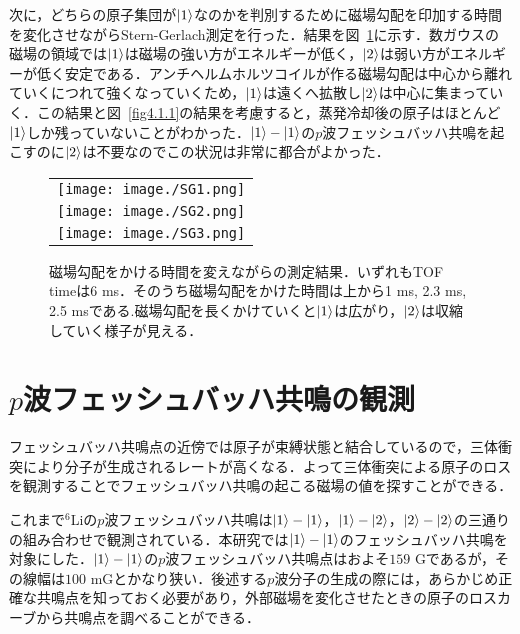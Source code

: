 \documentclass[11pt,a4j,notitlepage]{jreport}
\newcommand{\fig}[1]{図~\ref{#1}}	%
\begin{document}
次に，どちらの原子集団が$\ket{1}$なのかを判別するために磁場勾配を印加する時間を変化させながらStern-Gerlach測定を行った．結果を\fig{fig4.1.2}に示す．数ガウスの磁場の領域では$\ket{1}$は磁場の強い方がエネルギーが低く，$\ket{2}$は弱い方がエネルギーが低く安定である．アンチヘルムホルツコイルが作る磁場勾配は中心から離れていくにつれて強くなっていくため，$\ket{1}$は遠くへ拡散し$\ket{2}$は中心に集まっていく．この結果と\fig{fig4.1.1}の結果を考慮すると，蒸発冷却後の原子はほとんど$\ket{1}$しか残っていないことがわかった．$\ket{1}-\ket{1}$の$p$波フェッシュバッハ共鳴を起こすのに$\ket{2}$は不要なのでこの状況は非常に都合がよかった．
\begin{figure}[H]
	\begin{tabular}{c}
		\begin{minipage}[t]{1\hsize}
			\centering
				\texttt{[image: image./SG1.png]}
		\end{minipage} \\
		\begin{minipage}[t]{1\hsize}
			\centering
				\texttt{[image: image./SG2.png]}
		\end{minipage} \\
		\begin{minipage}[t]{1\hsize}
			\centering
				\texttt{[image: image./SG3.png]}
		\end{minipage}
	\end{tabular}
	\caption{磁場勾配をかける時間を変えながらの測定結果．いずれもTOF timeは6 ms．そのうち磁場勾配をかけた時間は上から1 ms, 2.3 ms, 2.5 msである.磁場勾配を長くかけていくと$\ket{1}$は広がり，$\ket{2}$は収縮していく様子が見える．}
	\label{fig4.1.2}
\end{figure}

\section{$p$波フェッシュバッハ共鳴の観測}
フェッシュバッハ共鳴点の近傍では原子が束縛状態と結合しているので，三体衝突により分子が生成されるレートが高くなる．よって三体衝突による原子のロスを観測することでフェッシュバッハ共鳴の起こる磁場の値を探すことができる\cite{JZhang}．

これまで$^6$Liの$p$波フェッシュバッハ共鳴は$\ket{1} - \ket{1}$，$\ket{1} - \ket{2}$，$\ket{2} - \ket{2}$の三通りの組み合わせで観測されている\cite{Mukaiyama}．本研究では$\ket{1}-\ket{1}$のフェッシュバッハ共鳴を対象にした．$\ket{1}-\ket{1}$の$p$波フェッシュバッハ共鳴点はおよそ$159$ Gであるが，その線幅は$100$ mGとかなり狭い．後述する$p$波分子の生成の際には，あらかじめ正確な共鳴点を知っておく必要があり，外部磁場を変化させたときの原子のロスカーブから共鳴点を調べることができる．
\end{document}

